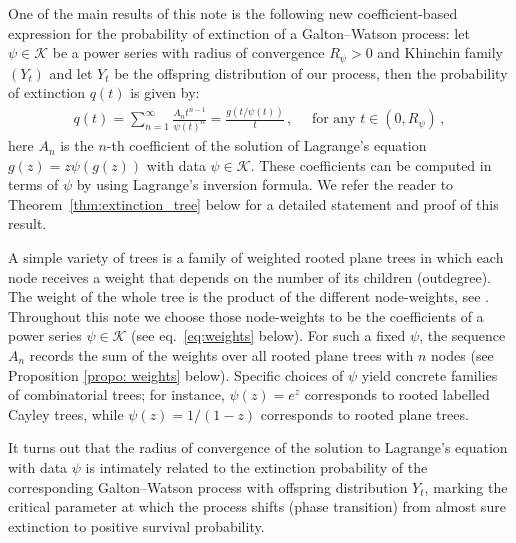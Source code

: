 \documentclass[11pt,a4paper,leqno]{amsart}
\theoremstyle{plain}
\theoremstyle{definition}
\numberwithin{equation}{section}
\def\K{\mathcal{K}}
\begin{document}
	
One of the main results of this note is the following new coefficient-based expression for
the probability of extinction of a Galton–Watson process: let $\psi \in \K$ be a power series with radius of convergence $R_{\psi}>0$ and Khinchin family $(Y_t)$ and let $Y_t$ be the offspring distribution of our process, then the probability of extinction $q(t)$ is given by:
	\begin{align}\label{eq: extinction_intro}
	q(t) = \sum_{n = 1}^{\infty}\frac{A_n t^{n-1}}{\psi(t)^n} = \frac{g(t/\psi(t))}{t}\,, \quad \text{ for any } t \in (0,R_{\psi})\,,
	\end{align}
 here $A_n$ is the $n$-th coefficient of the solution of Lagrange's equation $g(z) = z\psi(g(z))$ with data $\psi \in \K$. These coefficients can be computed in terms of $\psi$ by using Lagrange's inversion formula. We refer the reader to Theorem~\ref{thm:extinction_tree} below for a detailed statement and proof of this result.
\smallskip

A simple variety of trees is a family of weighted rooted plane trees in which each node receives a weight that depends on the number of its children (outdegree). The weight of the whole tree is the product of the different node-weights, see \cite[p. 452]{Flajolet}. Throughout this note we choose those node-weights to be the coefficients of a power series $\psi\in\mathcal{K}$ (see eq.~\eqref{eq:weights} below). For such a fixed $\psi$, the sequence $A_n$ records the sum of the weights over all rooted plane trees with $n$ nodes (see Proposition \ref{propo: weights} below). Specific choices of $\psi$ yield concrete families of combinatorial trees; for instance, $\psi(z)=e^{z}$ corresponds to rooted labelled Cayley trees, while $\psi(z)=1/(1-z)$ corresponds to rooted plane trees.
\smallskip 

	It turns out that the radius of convergence of the solution to Lagrange’s equation with data \(\psi\) is intimately related to the extinction probability of the corresponding Galton–Watson process with offspring distribution \(Y_t\), marking the critical parameter at which the process shifts (phase transition) from almost sure extinction to positive survival probability. 
\medskip
	
\end{document}
